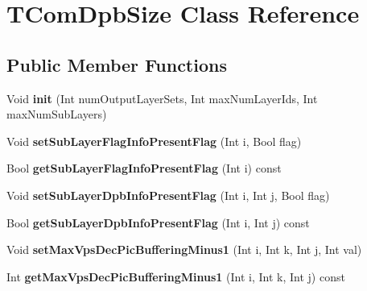 \hypertarget{class_t_com_dpb_size}{}\section{T\+Com\+Dpb\+Size Class Reference}
\label{class_t_com_dpb_size}
\subsection*{Public Member Functions}
\begin{DoxyCompactItemize}
\item 
\mbox{\label{class_t_com_dpb_size_a8149b50138ee6c2c854c84f7e000a2de}} 
Void {\bfseries init} (Int num\+Output\+Layer\+Sets, Int max\+Num\+Layer\+Ids, Int max\+Num\+Sub\+Layers)
\item 
\mbox{\label{class_t_com_dpb_size_a8f93363b615c3be7366f018c4e97be28}} 
Void {\bfseries set\+Sub\+Layer\+Flag\+Info\+Present\+Flag} (Int i, Bool flag)
\item 
\mbox{\label{class_t_com_dpb_size_aaa81c94eb84c6307626e32a470e06867}} 
Bool {\bfseries get\+Sub\+Layer\+Flag\+Info\+Present\+Flag} (Int i) const
\item 
\mbox{\label{class_t_com_dpb_size_a5c7b1c7104f882f8cacde02f94ede4c0}} 
Void {\bfseries set\+Sub\+Layer\+Dpb\+Info\+Present\+Flag} (Int i, Int j, Bool flag)
\item 
\mbox{\label{class_t_com_dpb_size_af01ab0a5ff7df7f4b1af1cf2b0c3bda6}} 
Bool {\bfseries get\+Sub\+Layer\+Dpb\+Info\+Present\+Flag} (Int i, Int j) const
\item 
\mbox{\label{class_t_com_dpb_size_ac20e9aaf9b53dd340e4993b2332dafad}} 
Void {\bfseries set\+Max\+Vps\+Dec\+Pic\+Buffering\+Minus1} (Int i, Int k, Int j, Int val)
\item 
\mbox{\label{class_t_com_dpb_size_afcf97aac667b978b4552bcfdc5bbc5e0}} 
Int {\bfseries get\+Max\+Vps\+Dec\+Pic\+Buffering\+Minus1} (Int i, Int k, Int j) const
\item 
\mbox{\label{class_t_com_dpb_size_a91f09757a072042218e53ea64a57cfaa}} 

\end{DoxyCompactItemize}
